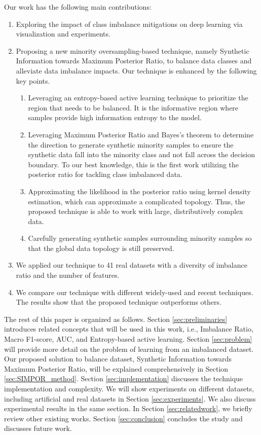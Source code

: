\documentclass[journal]{IEEEtai}
\newcommand{\MethodnameLong}{Synthetic Information towards Maximum Posterior Ratio}
\begin{document}
Our work has the following main contributions:
\begin{enumerate}
	\item{Exploring the impact of class imbalance mitigations on deep learning via visualization and experiments.}
	\item{Proposing a new minority oversampling-based technique, namely \MethodnameLong, to balance data classes and alleviate data imbalance impacts. Our technique is enhanced by the following key points.}
	\begin{enumerate}
		\item Leveraging an entropy-based active learning technique to prioritize the region that needs to be balanced. It is the informative region where samples provide high information entropy to the model. 
		\item Leveraging Maximum Posterior Ratio and Bayes's theorem to determine the direction to generate synthetic minority samples to ensure the synthetic data fall into the minority class and not fall across the decision boundary. To our best knowledge, this is the first work utilizing the posterior ratio for tackling class imbalanced data. 
		\item Approximating the likelihood in the posterior ratio using kernel density estimation, which can approximate a complicated topology. Thus, the proposed technique is able to work with large, distributively complex data. 
		\item Carefully generating synthetic samples surrounding minority samples so that the global data topology is still preserved. 
	\end{enumerate}
	\item{We applied our technique to 41 real datasets with a diversity of imbalance ratio and the number of features.}
	\item{We compare our technique with different widely-used and recent techniques. The results show that the proposed technique outperforms others.}
\end{enumerate}


The rest of this paper is organized as follows. Section \ref{sec:preliminaries} introduces related concepts that will be used in this work, i.e., Imbalance Ratio, Macro F1-score, AUC, and Entropy-based active learning. Section \ref{sec:problem} will provide more detail on the problem of learning from an imbalanced dataset. Our proposed solution to balance dataset, \MethodnameLong, will be explained comprehensively in Section \ref{sec:SIMPOR_method}. Section \ref{sec:implementation} discusses the technique implementation and complexity. We will show experiments on different datasets, including artificial and real datasets in Section \ref{sec:experiments}. We also discuss experimental results in the same section. In Section \ref{sec:relatedwork}, we briefly review other existing works. Section \ref{sec:conclusion} concludes the study and discusses future work. 
\end{document}
